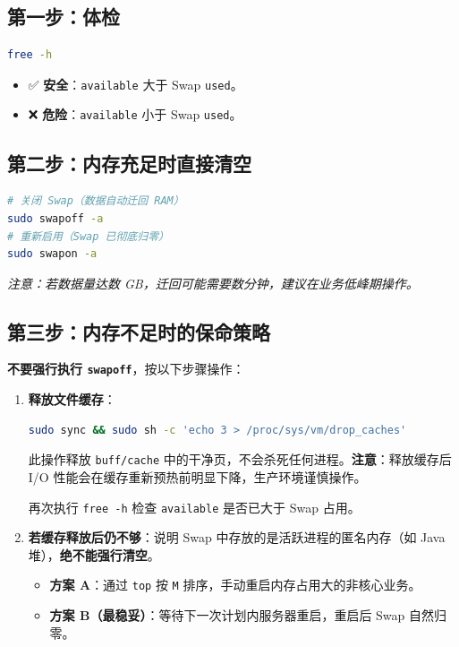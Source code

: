\subsection*{第一步：体检}

\begin{lstlisting}[language=bash]
free -h
\end{lstlisting}

\begin{itemize}[leftmargin=2cm]
	\item ✅ \textbf{安全}：\texttt{available} 大于 Swap \texttt{used}。
	\item ❌ \textbf{危险}：\texttt{available} 小于 Swap \texttt{used}。
\end{itemize}

\subsection*{第二步：内存充足时直接清空}

\begin{lstlisting}[language=bash]
# 关闭 Swap（数据自动迁回 RAM）
sudo swapoff -a
# 重新启用（Swap 已彻底归零）
sudo swapon -a
\end{lstlisting}

\textit{注意：若数据量达数 GB，迁回可能需要数分钟，建议在业务低峰期操作。}

\subsection*{第三步：内存不足时的保命策略}

\textbf{不要强行执行 \texttt{swapoff}}，按以下步骤操作：

\begin{enumerate}[leftmargin=2cm]
	\item \textbf{释放文件缓存}：

\begin{lstlisting}[language=bash]
sudo sync && sudo sh -c 'echo 3 > /proc/sys/vm/drop_caches'
\end{lstlisting}

	此操作释放 \texttt{buff/cache} 中的干净页，不会杀死任何进程。\textbf{注意}：释放缓存后 I/O 性能会在缓存重新预热前明显下降，生产环境谨慎操作。

	再次执行 \texttt{free -h} 检查 \texttt{available} 是否已大于 Swap 占用。

	\item \textbf{若缓存释放后仍不够}：说明 Swap 中存放的是活跃进程的匿名内存（如 Java 堆），\textbf{绝不能强行清空}。
	\begin{itemize}
		\item \textbf{方案 A}：通过 \texttt{top} 按 \texttt{M} 排序，手动重启内存占用大的非核心业务。
		\item \textbf{方案 B（最稳妥）}：等待下一次计划内服务器重启，重启后 Swap 自然归零。
	\end{itemize}
\end{enumerate}

